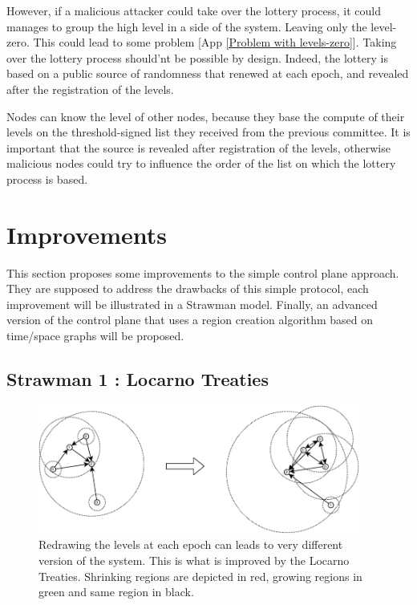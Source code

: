 \documentclass[a4paper,11pt,oneside]{report}
\begin{document}
However, if a malicious attacker could take over the lottery process, it could
manages to group the high level in a side of the system. Leaving only the
level-zero. This could lead to some problem [App \ref{Problem with
levels-zero}]. Taking over the lottery process should'nt be possible by design.
Indeed, the lottery is based on a public source of randomness that renewed at
each epoch, and revealed after the registration of the levels. 

Nodes can know the level of other nodes, because they base the compute of their
levels on the threshold-signed list they received from the previous committee.
It is important that the source is revealed after registration of the levels,
otherwise malicious nodes could try to influence the order of the list on which
the lottery process is based. 



\chapter{Improvements}
This section proposes some improvements to the simple control plane approach. They
are supposed to address the drawbacks of this simple protocol, each improvement
will be illustrated in a Strawman model. Finally, an advanced
version of the control plane that uses a region creation algorithm based on
time/space graphs will be proposed. 

\section{Strawman 1 : Locarno Treaties} \label{Locarno}

\begin{figure}[!h] 
\centering
\includegraphics[width=300pt]{figures/LocarnoTreaties-Redrawing}
\caption{Redrawing the levels at each epoch can leads to very different version
    of the system. This is what is improved by the Locarno Treaties. Shrinking
    regions are depicted in red, growing regions in green and same region in
    black.} \label{fig:LocarnoTreaties-Redrawing}
\end{figure}
\end{document}
